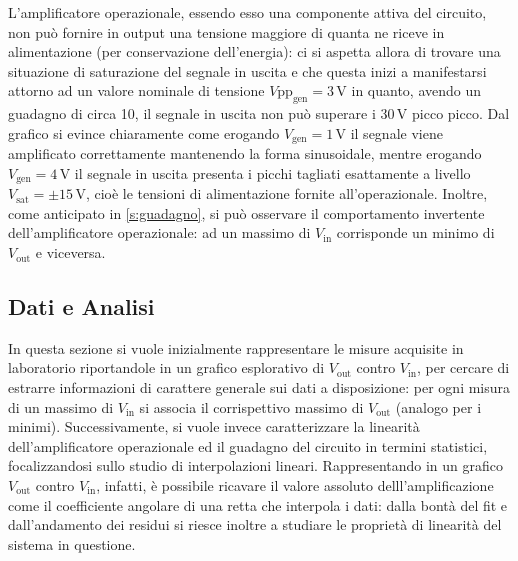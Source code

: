 \documentclass[a4paper,11pt]{article} %
\begin{document}
\noindent L'amplificatore operazionale, essendo esso una componente attiva del circuito, non può fornire in output una
tensione maggiore di quanta ne riceve in alimentazione (per conservazione dell'energia): ci si aspetta allora di trovare
una situazione di saturazione del segnale in uscita e che questa inizi a manifestarsi attorno ad un valore nominale di
tensione $V\text{pp}_{\text{gen}}=3\,\si{\volt}$ in quanto, avendo un guadagno di circa 10, il segnale in uscita non può
superare i $30\,\si{\volt}$ picco picco. Dal grafico si evince chiaramente come erogando $V_{\text{gen}}=1\,\si{\volt}$
il segnale viene amplificato correttamente mantenendo la forma sinusoidale, mentre erogando
$V_{\text{gen}}=4\,\si{\volt}$ il segnale in uscita presenta i picchi tagliati esattamente a livello $V_{\text{sat}}=\pm
15\,\si{\volt}$, cioè le tensioni di alimentazione fornite all'operazionale. Inoltre, come anticipato in
\autoref{s:guadagno}, si può osservare il comportamento invertente dell'amplificatore operazionale: ad un massimo di
$V_{\text{in}}$ corrisponde un minimo di $V_{\text{out}}$ e viceversa.\\



\subsection{Dati e Analisi}
In questa sezione si vuole inizialmente rappresentare le misure acquisite in laboratorio riportandole in un grafico
esplorativo di $V_{\text{out}}$ contro $V_{\text{in}}$, per cercare di estrarre informazioni di carattere generale sui
dati a disposizione: per ogni misura di un massimo di $V_{\text{in}}$ si associa il corrispettivo massimo di
$V_{\text{out}}$ (analogo per i minimi). Successivamente, si vuole invece caratterizzare la linearità dell'amplificatore
operazionale ed il guadagno del circuito in termini statistici, focalizzandosi sullo studio di interpolazioni lineari.
Rappresentando in un grafico $V_{\text{out}}$ contro $V_{\text{in}}$, infatti, è possibile ricavare il valore assoluto
delll'amplificazione come il coefficiente angolare di una retta che interpola i dati: dalla bontà del fit e
dall'andamento dei residui si riesce inoltre a studiare le proprietà di linearità del sistema in questione. 


\end{document}
